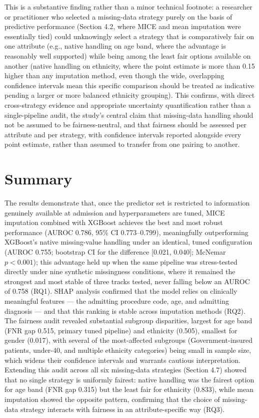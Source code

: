 \documentclass[12pt,a4paper]{report}
\begin{document}
This is a substantive finding rather than a minor technical footnote: a researcher or practitioner who selected a missing-data strategy purely on the basis of predictive performance (Section 4.2, where MICE and mean imputation were essentially tied) could unknowingly select a strategy that is comparatively fair on one attribute (e.g., native handling on age band, where the advantage is reasonably well supported) while being among the least fair options available on another (native handling on ethnicity, where the point estimate is more than 0.15 higher than any imputation method, even though the wide, overlapping confidence intervals mean this specific comparison should be treated as indicative pending a larger or more balanced ethnicity grouping). This confirms, with direct cross-strategy evidence and appropriate uncertainty quantification rather than a single-pipeline audit, the study's central claim that missing-data handling should not be assumed to be fairness-neutral, and that fairness should be assessed per attribute and per strategy, with confidence intervals reported alongside every point estimate, rather than assumed to transfer from one pairing to another.


\section{Summary}
The results demonstrate that, once the predictor set is restricted to information genuinely available at admission and hyperparameters are tuned, MICE imputation combined with XGBoost achieves the best and most robust performance (AUROC 0.786, 95\% CI 0.773--0.799), meaningfully outperforming XGBoost's native missing-value handling under an identical, tuned configuration (AUROC 0.755; bootstrap CI for the difference [0.021, 0.040]; McNemar $p<0.001$); this advantage held up when the same pipeline was stress-tested directly under nine synthetic missingness conditions, where it remained the strongest and most stable of three tracks tested, never falling below an AUROC of 0.758 (RQ1). SHAP analysis confirmed that the model relies on clinically meaningful features --- the admitting procedure code, age, and admitting diagnosis --- and that this ranking is stable across imputation methods (RQ2). The fairness audit revealed substantial subgroup disparities, largest for age band (FNR gap 0.515, primary tuned pipeline) and ethnicity (0.505), smallest for gender (0.017), with several of the most-affected subgroups (Government-insured patients, under-40, and multiple ethnicity categories) being small in sample size, which widens their confidence intervals and warrants cautious interpretation. Extending this audit across all six missing-data strategies (Section 4.7) showed that no single strategy is uniformly fairest: native handling was the fairest option for age band (FNR gap 0.315) but the least fair for ethnicity (0.833), while mean imputation showed the opposite pattern, confirming that the choice of missing-data strategy interacts with fairness in an attribute-specific way (RQ3).
\end{document}
